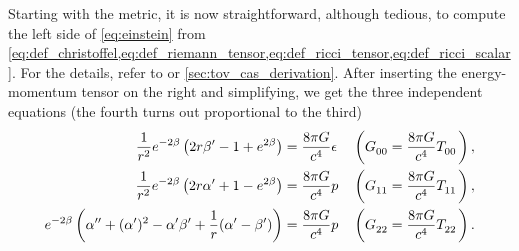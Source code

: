 Starting with the metric, it is now straightforward, although tedious, to compute the left side of \cref{eq:einstein} from \cref{eq:def_christoffel,eq:def_riemann_tensor,eq:def_ricci_tensor,eq:def_ricci_scalar}.
For the details, refer to \cite[equation 5.11-5.15]{ref:carroll} or \cref{sec:tov_cas_derivation}.
After inserting the energy-momentum tensor on the right and simplifying, we get the three independent equations
(the fourth turns out proportional to the third)
\begin{subequations}
\begin{align}
	\frac{1}{r^2} e^{-2 \beta} \left( 2 r \beta' - 1 + e^{2 \beta} \right)                               &= \frac{8 \pi G}{c^4} \epsilon
	&& \left( G\indices{_0_0} = \frac{8 \pi G}{c^4} T\indices{_0_0} \right) , \label{eq:einstein_to_tov:tt} \\
	\frac{1}{r^2} e^{-2 \beta} \left( 2 r \alpha' + 1 - e^{2 \beta} \right)                              &= \frac{8 \pi G}{c^4} p
	&& \left( G\indices{_1_1} = \frac{8 \pi G}{c^4} T\indices{_1_1} \right) , \label{eq:einstein_to_tov:rr} \\
	e^{-2 \beta} \left( \alpha'' + (\alpha')^2 - \alpha' \beta' + \frac{1}{r} (\alpha' - \beta') \right) &= \frac{8 \pi G}{c^4} p
	&& \left( G\indices{_2_2} = \frac{8 \pi G}{c^4} T\indices{_2_2} \right) . \label{eq:einstein_to_tov:thetatheta}
\end{align}
\end{subequations}

